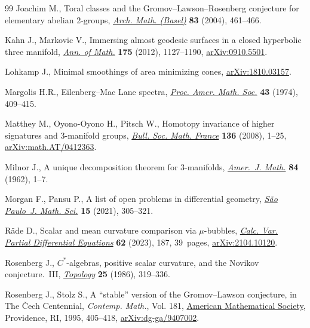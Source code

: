 \begin{thebibliography}{99}
Joachim M., Toral classes and the {G}romov--{L}awson--{R}osenberg conjecture
 for elementary abelian 2-groups, \href{https://doi.org/10.1007/s00013-004-1080-5}{\textit{Arch. Math. (Basel)}} \textbf{83}
 (2004), 461--466.

Kahn J., Markovic V., Immersing almost geodesic surfaces in a closed hyperbolic
 three manifold, \href{https://doi.org/10.4007/annals.2012.175.3.4}{\textit{Ann. of Math.}} \textbf{175} (2012), 1127--1190,
 \href{https://arxiv.org/abs/0910.5501}{arXiv:0910.5501}.

Lohkamp J., Minimal smoothings of area minimizing cones, \href{https://arxiv.org/abs/1810.03157}{arXiv:1810.03157}.

Margolis H.R., Eilenberg--{M}ac {L}ane spectra, \href{https://doi.org/10.2307/2038905}{\textit{Proc. Amer. Math. Soc.}}
 \textbf{43} (1974), 409--415.

Matthey M., Oyono-Oyono H., Pitsch W., Homotopy invariance of higher signatures
 and 3-manifold groups, \href{https://doi.org/10.24033/bsmf.2547}{\textit{Bull. Soc. Math. France}} \textbf{136} (2008),
 1--25, \href{https://arxiv.org/abs/math.AT/0412363}{arXiv:math.AT/0412363}.

Milnor J., A unique decomposition theorem for 3-manifolds, \href{https://doi.org/10.2307/2372800}{\textit{Amer.~J.
 Math.}} \textbf{84} (1962), 1--7.

Morgan F., Pansu P., A list of open problems in differential geometry,
 \href{https://doi.org/10.1007/s40863-019-00141-8}{\textit{S\~ao Paulo~J. Math. Sci.}} \textbf{15} (2021), 305--321.

R\"ade D., Scalar and mean curvature comparison via {$\mu $}-bubbles,
 \href{https://doi.org/10.1007/s00526-023-02520-8}{\textit{Calc. Var. Partial Differential Equations}} \textbf{62} (2023), 187,
 39~pages, \href{https://arxiv.org/abs/2104.10120}{arXiv:2104.10120}.

Rosenberg J., {$C^\ast$}-algebras, positive scalar curvature, and the {N}ovikov
 conjecture.~{III}, \href{https://doi.org/10.1016/0040-9383(86)90047-9}{\textit{Topology}} \textbf{25} (1986), 319--336.

Rosenberg J., Stolz S., A ``stable'' version of the {G}romov--{L}awson
 conjecture, in The {\v{C}}ech {C}entennial, \textit{Contemp. Math.}, Vol.
 181, \href{https://doi.org/10.1090/conm/181/02046}{American Mathematical Society}, Providence, RI, 1995, 405--418,
 \href{https://arxiv.org/abs/dg-ga/9407002}{arXiv:dg-ga/9407002}.


\end{thebibliography}
